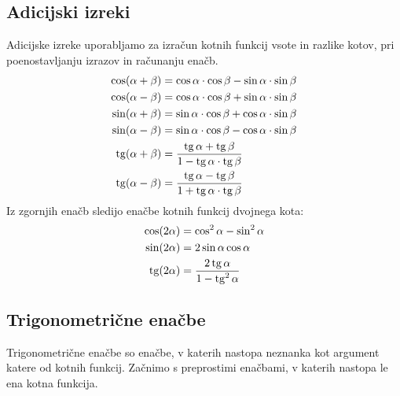\subsection{Adicijski izreki}
Adicijske izreke uporabljamo za izračun kotnih funkcij vsote in razlike kotov, pri poenostavljanju izrazov in računanju enačb.
\begin{align*}
\cos(\alpha+ \beta) &= \cos\alpha \cdot \cos\beta - \sin\alpha \cdot \sin\beta \\
\cos(\alpha - \beta) &= \cos\alpha \cdot \cos\beta + \sin\alpha \cdot \sin\beta \\
\sin(\alpha + \beta) &= \sin\alpha \cdot \cos\beta + \cos\alpha \cdot \sin\beta \\
\sin(\alpha - \beta) &= \sin\alpha \cdot \cos\beta - \cos\alpha \cdot \sin\beta \\
\operatorname{tg}(\alpha + \beta) &= \frac{\operatorname{tg}\alpha + \operatorname{tg}\beta}{1- \operatorname{tg}\alpha \cdot \operatorname{tg}\beta} \\
\operatorname{tg}(\alpha - \beta) &= \frac{\operatorname{tg}\alpha - \operatorname{tg}\beta}{1+ \operatorname{tg}\alpha \cdot \operatorname{tg}\beta}
\end{align*}
Iz zgornjih enačb sledijo enačbe kotnih funkcij dvojnega kota:
\begin{align*}
\cos(2\alpha) &= \cos^2\alpha- \sin^2\alpha\\
\sin(2\alpha) &= 2\sin\alpha \cos\alpha \\
\operatorname{tg}(2\alpha) &= \frac{2\operatorname{tg}\alpha}{1- \operatorname{tg}^2\alpha} \\
\end{align*}

\subsection{Trigonometrične enačbe}

Trigonometrične enačbe so enačbe, v katerih nastopa neznanka kot argument katere od kotnih funkcij. Začnimo s preprostimi enačbami, v katerih nastopa le ena kotna funkcija.

